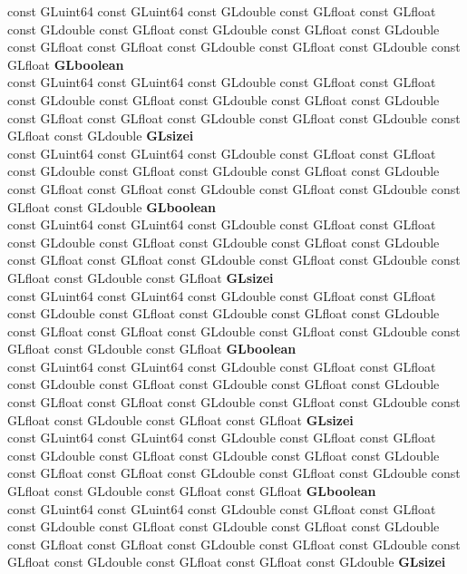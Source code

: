 \begin{DoxyCompactItemize}
\begin{tabbing}
\>const GLuint64 const GLuint64 const GLdouble const GLfloat const GLfloat const GLdouble const GLfloat const GLdouble const GLfloat const GLdouble const GLfloat const GLfloat const GLdouble const GLfloat const GLdouble const GLfloat {\bfseries GLboolean}\\
\>const GLuint64 const GLuint64 const GLdouble const GLfloat const GLfloat const GLdouble const GLfloat const GLdouble const GLfloat const GLdouble const GLfloat const GLfloat const GLdouble const GLfloat const GLdouble const GLfloat const GLdouble {\bfseries GLsizei}\\
\>const GLuint64 const GLuint64 const GLdouble const GLfloat const GLfloat const GLdouble const GLfloat const GLdouble const GLfloat const GLdouble const GLfloat const GLfloat const GLdouble const GLfloat const GLdouble const GLfloat const GLdouble {\bfseries GLboolean}\\
\>const GLuint64 const GLuint64 const GLdouble const GLfloat const GLfloat const GLdouble const GLfloat const GLdouble const GLfloat const GLdouble const GLfloat const GLfloat const GLdouble const GLfloat const GLdouble const GLfloat const GLdouble const GLfloat {\bfseries GLsizei}\\
\>const GLuint64 const GLuint64 const GLdouble const GLfloat const GLfloat const GLdouble const GLfloat const GLdouble const GLfloat const GLdouble const GLfloat const GLfloat const GLdouble const GLfloat const GLdouble const GLfloat const GLdouble const GLfloat {\bfseries GLboolean}\\
\>const GLuint64 const GLuint64 const GLdouble const GLfloat const GLfloat const GLdouble const GLfloat const GLdouble const GLfloat const GLdouble const GLfloat const GLfloat const GLdouble const GLfloat const GLdouble const GLfloat const GLdouble const GLfloat const GLfloat {\bfseries GLsizei}\\
\>const GLuint64 const GLuint64 const GLdouble const GLfloat const GLfloat const GLdouble const GLfloat const GLdouble const GLfloat const GLdouble const GLfloat const GLfloat const GLdouble const GLfloat const GLdouble const GLfloat const GLdouble const GLfloat const GLfloat {\bfseries GLboolean}\\
\>const GLuint64 const GLuint64 const GLdouble const GLfloat const GLfloat const GLdouble const GLfloat const GLdouble const GLfloat const GLdouble const GLfloat const GLfloat const GLdouble const GLfloat const GLdouble const GLfloat const GLdouble const GLfloat const GLfloat const GLdouble {\bfseries GLsizei}\\

\end{tabbing}
\end{DoxyCompactItemize}
